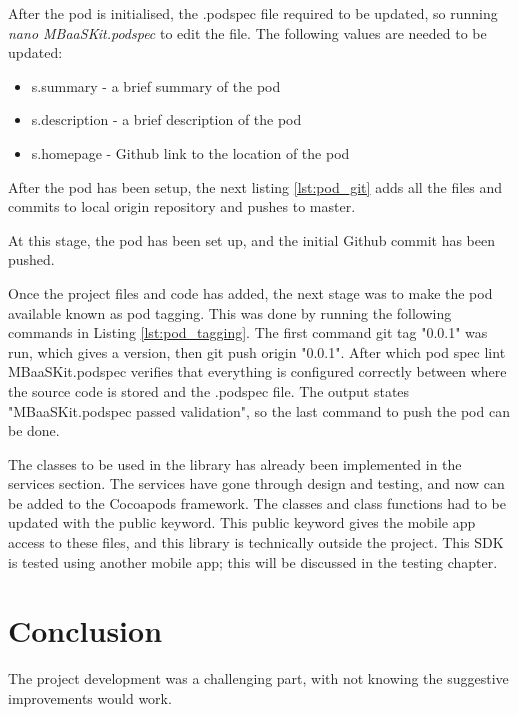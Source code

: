 After the pod is initialised, the .podspec file required to be updated, so running \textit{nano MBaaSKit.podspec} to edit the file. The following values are needed to be updated: 

\begin{itemize}
  \item s.summary
  - a brief summary of the pod
  \item s.description
  - a brief description of the pod
  \item s.homepage
  - Github link to the location of the pod
\end{itemize}

After the pod has been setup, the next listing \ref{lst:pod_git} adds all the files and commits to local origin repository and pushes to master.



At this stage, the pod has been set up, and the initial Github commit has been pushed. 

Once the project files and code has added, the next stage was to make the pod available known as pod tagging. This was done by running the following commands in Listing \ref{lst:pod_tagging}. The first command git tag "0.0.1" was run, which gives a version, then git push origin "0.0.1". After which pod spec lint MBaaSKit.podspec verifies that everything is configured correctly between where the source code is stored and the .podspec file. The output states "MBaaSKit.podspec passed validation", so the last command to push the pod can be done. 



The classes to be used in the library has already been implemented in the services section. The services have gone through design and testing, and now can be added to the Cocoapods framework. The classes and class functions had to be updated with the public keyword. This public keyword gives the mobile app access to these files, and this library is technically outside the project. This SDK is tested using another mobile app; this will be discussed in the testing chapter.

\section{Conclusion}

The project development was a challenging part, with not knowing the suggestive improvements would work.

